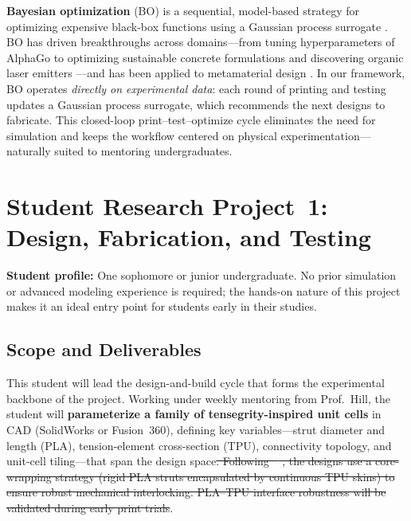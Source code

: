\documentclass[11pt]{article}
\providecommand{\DIFdeltex}[1]{{\protect\color{red}\sout{#1}}}                      %
\providecommand{\DIFdelbegin}{} %
\providecommand{\DIFdelend}{} %
\providecommand{\DIFdel}[1]{\texorpdfstring{\DIFdeltex{#1}}{}} %
\newcommand{\DIFscaledelfig}{0.5}
\newlength{\DIFdelgraphicswidth} %
\newlength{\DIFdelgraphicsheight} %
\newcommand{\DIFdelincludegraphics}[2][]{%
\sbox{\DIFdelgraphicsbox}{\DIFOincludegraphics[#1]{#2}}%
\settoboxwidth{\DIFdelgraphicswidth}{\DIFdelgraphicsbox} %
\settoboxtotalheight{\DIFdelgraphicsheight}{\DIFdelgraphicsbox} %
\scalebox{\DIFscaledelfig}{%
\parbox[b]{\DIFdelgraphicswidth}{\usebox{\DIFdelgraphicsbox}\\[-\baselineskip] \rule{\DIFdelgraphicswidth}{0em}}\llap{\resizebox{\DIFdelgraphicswidth}{\DIFdelgraphicsheight}{%
\setlength{\unitlength}{\DIFdelgraphicswidth}%
\begin{picture}(1,1)%
\thicklines\linethickness{2pt} %
{\color[rgb]{1,0,0}\put(0,0){\framebox(1,1){}}}%
{\color[rgb]{1,0,0}\put(0,0){\line( 1,1){1}}}%
{\color[rgb]{1,0,0}\put(0,1){\line(1,-1){1}}}%
\end{picture}%
}\hspace*{3pt}}} %
} %
\DeclareRobustCommand{\DIFdelbegin}{\DIFOdelbegin \let\includegraphics\DIFdelincludegraphics} %
\DeclareRobustCommand{\DIFdelend}{\DIFOaddend \let\includegraphics\DIFOincludegraphics} %
\begin{document}
\textbf{Bayesian optimization} (BO) is a sequential, model-based strategy for
optimizing expensive black-box functions using a Gaussian process surrogate
\citep{shahriari2016taking, frazier2018tutorial}.  BO has driven breakthroughs
across domains---from tuning hyperparameters of AlphaGo
\citep{silver2016mastering} to optimizing sustainable concrete formulations
\citep{ament2023sustainable} and discovering organic laser
emitters \citep{striethkalthoff2024delocalized}---and has been applied to
metamaterial design \citep{mo2023accelerated}.  In our framework, BO operates
\emph{directly on experimental data}: each round of printing and testing
updates a Gaussian process surrogate, which recommends the next designs to fabricate.  This closed-loop
print--test--optimize cycle eliminates the need for simulation and
keeps the workflow centered on physical experimentation---naturally suited to mentoring undergraduates.

\section{Student Research Project~1: Design, Fabrication, and Testing}

\textbf{Student profile:} One sophomore or junior undergraduate.  No prior
simulation or advanced modeling experience is required; the hands-on nature of
this project makes it an ideal entry point for students early in their studies.

\subsection*{Scope and Deliverables}

This student will lead the design-and-build cycle that forms the experimental
backbone of the project.  Working under weekly mentoring from
Prof.~Hill, the student will \textbf{parameterize a family of
tensegrity-inspired unit cells} in CAD (SolidWorks or Fusion~360), defining key
variables---strut diameter and length (PLA), tension-element cross-section
(TPU), connectivity topology, and unit-cell tiling---that span the design space\DIFdelbegin \DIFdel{.
Following \mbox{%
\citet{ye2023multimaterial}}\hskip0pt%
, the designs use a core-wrapping strategy
(rigid PLA struts encapsulated by continuous TPU skins) to ensure robust
mechanical interlocking. PLA--TPU interface robustness will be validated during early print trials}\DIFdelend .
\end{document}
